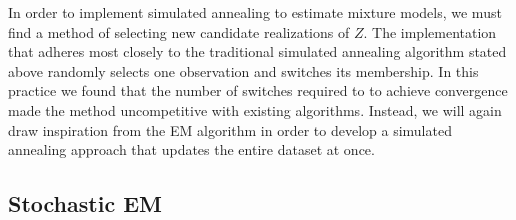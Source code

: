 \documentclass{article}
\theoremstyle{definition}
\theoremstyle{algodesc}
\begin{document}
In order to implement simulated annealing to estimate mixture models, we must find a method of selecting new candidate realizations of $Z$. The implementation that adheres most closely to the traditional simulated annealing algorithm stated above randomly selects one observation and switches its membership. In this practice we found that the number of switches required to to achieve convergence made the method uncompetitive with existing algorithms. Instead, we will again draw inspiration from the EM algorithm in order to develop a simulated annealing approach that updates the entire dataset at once.


\subsection{Stochastic EM}
\end{document}
